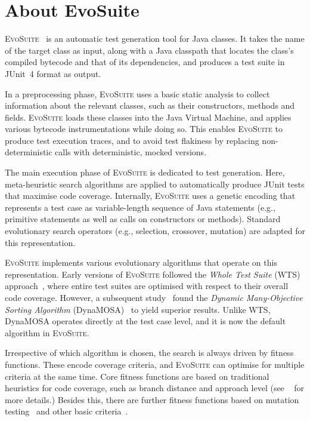 \documentclass[10pt,conference]{IEEEtran}
\newcommand{\EVOSUITE}{\textsc{EvoSuite}\xspace}
\begin{document}
\section{About EvoSuite}

\EVOSUITE~\cite{FrA11c} is an automatic test generation tool for Java classes.
It takes the name of the target class as input, along with a Java classpath that
locates the class's compiled bytecode and that of its dependencies, and produces
a test suite in JUnit~4 format as output.

In a preprocessing phase, \EVOSUITE uses a basic static analysis to collect
information about the relevant classes, such as their constructors, methods
and fields. \EVOSUITE loads these classes into the Java Virtual Machine, and
applies various bytecode instrumentations while doing so. This enables \EVOSUITE
to produce test execution traces, and to avoid test flakiness by replacing
non-deterministic calls with deterministic, mocked versions.

The main execution phase of \EVOSUITE is dedicated to test generation. Here,
meta-heuristic search algorithms are applied to automatically produce JUnit
tests that maximise code coverage. Internally, \EVOSUITE uses a genetic encoding
that represents a test case as variable-length sequence of Java statements
(e.g., primitive statements as well as calls on constructors or methods).
Standard evolutionary search operators (e.g., selection, crossover, mutation)
are adapted for this representation.

\EVOSUITE implements various evolutionary algorithms that operate on this
representation. Early versions of \EVOSUITE followed the \emph{Whole Test Suite} (WTS)
approach~\cite{GoA_TSE12}, where entire test suites are optimised with
respect to their overall code coverage. However, a subsequent study~\cite{ea_evaluation}
found the \emph{Dynamic Many-Objective Sorting Algorithm} (DynaMOSA)~\cite{dynamosa}
to yield superior results. Unlike WTS, DynaMOSA operates directly at the test case level,
and it is now the default algorithm in \EVOSUITE.

Irrespective of which algorithm is chosen, the search is always driven by fitness
functions. These encode coverage criteria, and \EVOSUITE can optimise for multiple
criteria at the same time. Core fitness functions are based on traditional heuristics
for code coverage, such as branch distance and approach level (see ~\cite{GoA_TSE12} for more details.)
Besides this, there are further fitness functions based on mutation
testing~\cite{emse14_mutation} and other basic criteria~\cite{rojas2015combining}.
\end{document}
